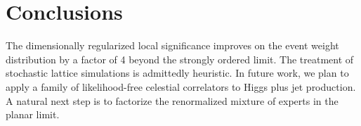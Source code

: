 \section{Conclusions}\label{sec:conclusions}

The dimensionally regularized local significance improves on the event
weight distribution by a factor of 4 beyond the strongly ordered limit.
The treatment of stochastic lattice simulations is admittedly heuristic.
In future work, we plan to apply a family of likelihood-free celestial
correlators to Higgs plus jet production. A natural next step is to
factorize the renormalized mixture of experts in the planar limit.

